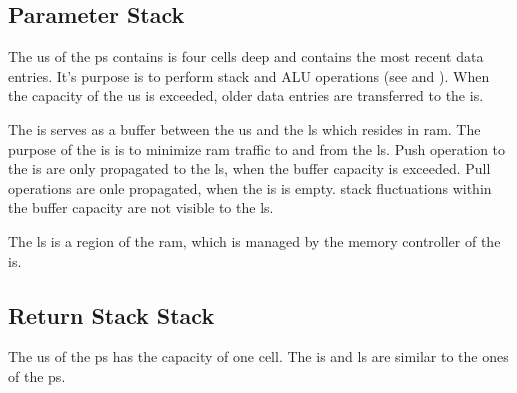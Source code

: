 \subsection{Parameter Stack}
\label{stacks:ps}

The \gls{us} of the \gls{ps} contains is four \glspl{cell} deep and contains the
most recent data entries. It's purpose is to perform stack and ALU operations
(see  and ).
When the capacity of the \gls{us} is exceeded, older data entries are transferred
to the \gls{is}.

The \gls{is} serves as a buffer between the \gls{us} and the \gls{ls} which resides
in \gls{ram}. The purpose of the \gls{is} is to minimize \gls{ram} traffic to and
from the \gls{ls}.
Push operation to the \gls{is} are only propagated to the \gls{ls}, when the buffer
capacity is exceeded. Pull operations are onle propagated, when the \gls{is} is empty.
\Gls{stack} fluctuations within the buffer capacity are not visible to the \gls{ls}.

The \gls{ls} is a region of the \gls{ram}, which is managed by the memory controller
of the \gls{is}.

\subsection{Return Stack Stack}
\label{stacks:ps}

The \gls{us} of the \gls{ps} has the capacity of one \gls{cell}. The \gls{is} and
\gls{ls} are similar to the ones of the \gls{ps}.
